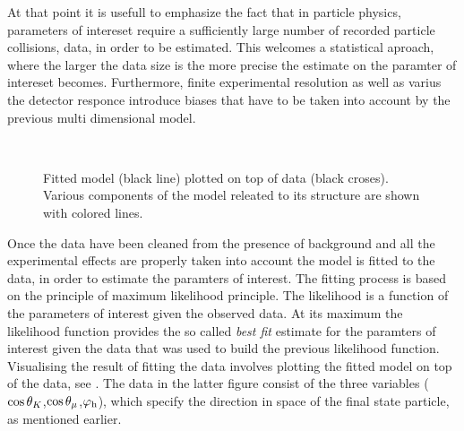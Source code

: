 At that point it is usefull to emphasize the fact that in particle physics, parameters of intereset
require a sufficiently large number of recorded particle collisions, data, in order to be estimated.
This welcomes a statistical aproach, where the larger the data size is the more precise the estimate
on the paramter of intereset becomes. Furthermore, finite experimental resolution as well as
varius the detector responce introduce biases that have to be taken into account by the previous
multi dimensional model.

\begin{figure}[!t]
  \begin{subfigure}{0.5\textwidth}
    \centering
    \scalebox{1.2}{}
  \end{subfigure}%
  \hfill
  \begin{subfigure}{0.5\textwidth}
    \centering
    \scalebox{1.2}{}
  \end{subfigure}\\
  \begin{subfigure}{\textwidth}
    \centering
    \scalebox{1.2}{}
  \end{subfigure}
  \caption{Fitted model (black line) plotted on top of \BsJpsiKst data (black croses).
           Various components of the model releated to its \CP structure are shown with colored lines.}
  \label{app_angular_plot_thetas}
\end{figure}

Once the data have been cleaned from the presence of background and all the experimental effects are
properly taken into account the model is fitted to the data, in order to estimate the paramters of interest.
The fitting process is based on the principle of maximum likelihood principle. The likelihood is a
function of the parameters of interest given the observed data. At its maximum the likelihood function
provides the so called {\it best fit} estimate for the paramters of interest given the data that was
used to build the previous likelihood function. Visualising the result of fitting the data involves
plotting the fitted model on top of the data, see . The data in the latter figure consist
of the three variables ($\cos\theta_{K}$,$\cos\theta_{\mu}$,$\varphi_{\rm h}$), which specify the direction in space
of the final state particle, as mentioned earlier.



